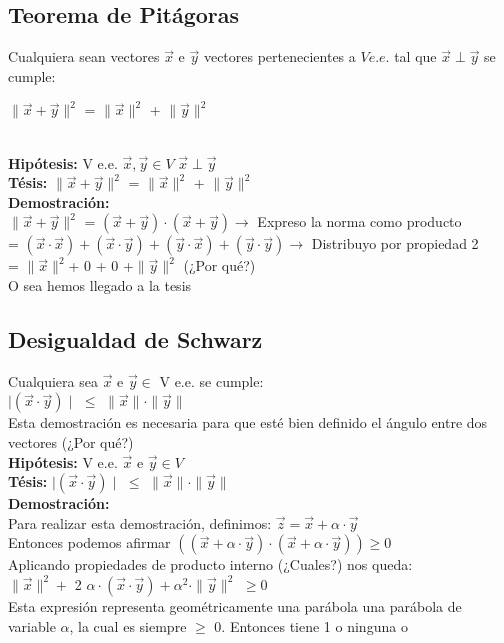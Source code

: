 \documentclass{article}
\begin{document}
\subsection{Teorema de Pitágoras}
Cualquiera sean vectores $\vec{x}$ e $\vec{y}$ vectores pertenecientes a $V e.e.$ tal que $\vec{x}\perp\vec{y}$ se cumple: \\
\centerline {$\parallel\vec{x}+\vec{y}\parallel^2$ = $\parallel\vec{x}\parallel^2$ + $\parallel\vec{y}\parallel^2$}\\
\textbf{Hipótesis:} V e.e. $\vec{x}, \vec{y} \in V$ $\vec{x}\perp\vec{y}$\\
\textbf{Tésis:} $\parallel\vec{x}+\vec{y}\parallel^2$ = $\parallel\vec{x}\parallel^2$ + $\parallel\vec{y}\parallel^2$ \\
\textbf {Demostración:}\\
$\parallel\vec{x}+\vec{y}\parallel^2$ = $(\vec{x} + \vec{y})\cdot(\vec{x} + \vec{y}) \rightarrow$ Expreso la norma como producto \\ 
 = $(\vec{x}\cdot\vec{x}) + (\vec{x}\cdot\vec{y}) + (\vec{y}\cdot\vec{x})+ (\vec{y}\cdot\vec{y}) \rightarrow$ Distribuyo por propiedad 2 \\
 = $\parallel\vec{x}\parallel^2$+  0  +  0  +$\parallel\vec{y}\parallel^2$ (¿Por qué?) \\
O sea hemos llegado a la tesis
\subsection{Desigualdad de Schwarz}
Cualquiera sea $\vec{x}$ e $\vec{y} \in $ V e.e. se cumple: \\
$\mid(\vec{x}\cdot\vec{y})\mid$ $\leq$ $\parallel\vec{x}\parallel \cdot \parallel\vec{y}\parallel $ \\
Esta demostración es necesaria para que esté bien definido el ángulo entre dos vectores (¿Por qué?)\\
\textbf{Hipótesis:} V e.e. $\vec{x}$ e $\vec{y} \in V$ \\
\textbf{Tésis:} $\mid(\vec{x}\cdot\vec{y})\mid$ $\leq$ $\parallel\vec{x}\parallel \cdot \parallel\vec{y}\parallel $ \\
\textbf {Demostración:} \\
Para realizar esta demostración, definimos: $\vec{z} = \vec{x} + \alpha\cdot\vec{y}$ \\
Entonces podemos afirmar $((\vec{x} + \alpha\cdot\vec{y})\cdot(\vec{x} + \alpha\cdot\vec{y})) \geq 0$\\
Aplicando propiedades de producto interno (¿Cuales?) nos queda: \\
$\parallel\vec{x}\parallel^2 +$ 2 $\alpha\cdot(\vec{x}\cdot\vec{y}) + \alpha^2 \cdot \parallel\vec{y}\parallel^2$ $\geq 0$\\
Esta expresión representa geométricamente una parábola una parábola de variable $\alpha$, la cual es siempre $\geq$ 0. Entonces tiene 1 o ninguna o 
\end{document}
